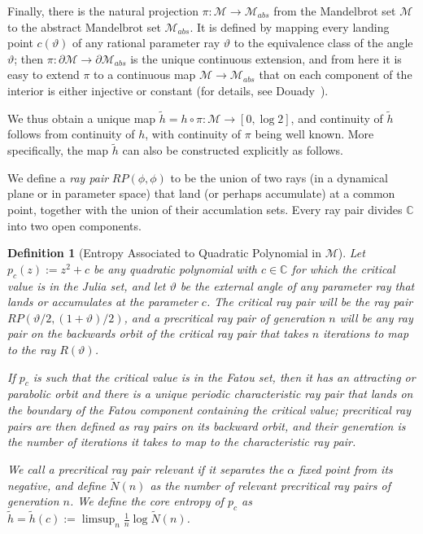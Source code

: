 \documentclass[12pt]{amsart}
\newcommand{\M}{\mathscr M}
\newcommand{\C}{\mathbb C}
\newcommand{\0}{\texttt{0}}
\newcommand{\1}{\texttt{1}}
\newtheorem{definition}[theorem]{Definition}
\theoremstyle{definition}
\numberwithin{equation}{section}
\renewcommand{\theta}{\vartheta}
\begin{document}
Finally, there is the natural projection $\pi\colon\M\to\M_{abs}$ from the Mandelbrot set $\M$ to the abstract Mandelbrot set $\M_{abs}$. It is defined by mapping every landing point $c(\theta)$ of any rational parameter ray $\theta$ to the equivalence class of the angle $\theta$; then $\pi\colon\partial\M\to\partial\M_{abs}$ is the unique continuous extension, and from here it is easy to extend $\pi$ to a continuous map $\M\to\M_{abs}$ that on each component of the interior is either injective or constant (for details, see Douady~\cite{DouadyCompacts}).


We thus obtain a unique map $\tilde h=h\circ\pi\colon\M\to[0,\log 2]$, and continuity of $\tilde h$ follows from continuity of $h$, with continuity of $\pi$ being well known.
More specifically, the map $\tilde h$ can also be constructed explicitly as follows.

We define a \emph{ray pair} $RP(\phi,\phi)$ to be the union of two rays (in a dynamical plane or in parameter space) that land (or perhaps accumulate) at a common point, together with the union of their accumlation sets. Every ray pair divides $\C$ into two open components. 


\begin{definition}[Entropy Associated to Quadratic Polynomial in $\M$]
\label{Def:CoreEntropyTilde}
Let $p_c(z):=z^2+c$ be any quadratic polynomial with $c\in\C$ for which the critical value is in the Julia set, and let $\theta$ be the external angle of any parameter ray that lands or accumulates at the parameter $c$. The \emph{critical ray pair} will be the ray pair $RP(\theta/2,(1+\theta)/2)$, and a precritical ray pair of generation $n$ will be any ray pair on the backwards orbit of the critical ray pair that takes $n$ iterations to map to the ray $R(\theta)$. 



If $p_c$ is such that the critical value is in the Fatou set, then it has an attracting or parabolic orbit and there is a unique periodic characteristic ray pair that lands on the boundary of the Fatou component containing the critical value; precritical ray pairs are then defined as ray pairs on its backward orbit, and their generation is the number of iterations it takes to map to the characteristic ray pair.

We call a precritical ray pair \emph{relevant} if it separates the $\alpha$ fixed point from its negative, and define $\tilde N(n)$ as the number of relevant precritical ray pairs of generation $n$. We define the \emph{core entropy} of $p_c$ as $\tilde h=\tilde h(c):=\limsup_n\frac 1 n \log \tilde N(n)$.
\end{definition}
\end{document}
